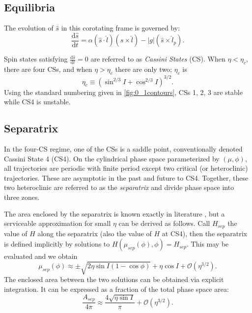\documentclass[
        fleqn,
        usenatbib,
    ]{mnras}
\newcommand*{\rd}[2]{\frac{\mathrm{d}#1}{\mathrm{d}#2}}
\newcommand*{\abs}[1]{\left|#1\right|}
\newcommand*{\p}[1]{\left(#1\right)}
\begin{document}
\subsection{Equilibria}

The evolution of $\hat{s}$ in this corotating frame is governed by:
\begin{equation}
    \rd{\hat{s}}{t} = \alpha \p{\hat{s} \cdot \hat{l}}
            \p{\hat{s} \times \hat{l}}
        - \abs{g}\p{\hat{s} \times \hat{l}_p}.
        \label{eq:dsdt_base}
\end{equation}

Spin states satisfying $\rd{\hat{s}}{t} = 0$ are referred to as \emph{Cassini
States} (CS). When $\eta < \eta_c$, there are four CSs, and when $\eta > \eta_c$
there are only two; $\eta_c$ is
\begin{equation}
    \eta_c \equiv \p{\sin^{2/3}I + \cos^{2/3}I}^{3/2}.
\end{equation}
Using the standard numbering given in \autoref{fig:0_1contours}, CSs 1, 2, 3 are
stable while CS4 is unstable.

\subsection{Separatrix}

In the four-CS regime, one of the CSs is a saddle point, conventionally denoted
Cassini State 4 (CS4). On the cylindrical phase space parameterized by $(\mu,
\phi)$, all trajectories are periodic with finite period except two critical (or
heteroclinic) trajectories. These are asymptotic in the past and future to CS4.
Together, these two heteroclinic are referred to as the \emph{separatrix} and
divide phase space into three zones.

The area enclosed by the separatrix is known exactly in literature
\citep{henrard1987}, but a serviceable approximation for small $\eta$ can be
derived as follows. Call $H_{sep}$ the value of $H$ along the separatrix (also
the value of $H$ at CS4), then the separatrix is defined implicitly by solutions
to $H\p{\mu_{sep}(\phi), \phi} = H_{sep}$. This may be evaluated and we obtain
\begin{equation}
    \mu_{sep}(\phi) \approx \pm \sqrt{2\eta \sin I \p{1 - \cos \phi}}
        + \eta \cos I + \mathcal{O}\p{\eta^{3/2}}.\label{eq:mu_sep}
\end{equation}
The enclosed area between the two solutions can be obtained via explicit
integration. It can be expressed as a fraction of the total phase space area:
\begin{equation}
    \frac{A_{sep}}{4\pi} \approx \frac{4\sqrt{\eta \sin I}}{\pi}
        + \mathcal{O}\p{\eta^{3/2}}.\label{eq:a_sep}
\end{equation}
\end{document}
